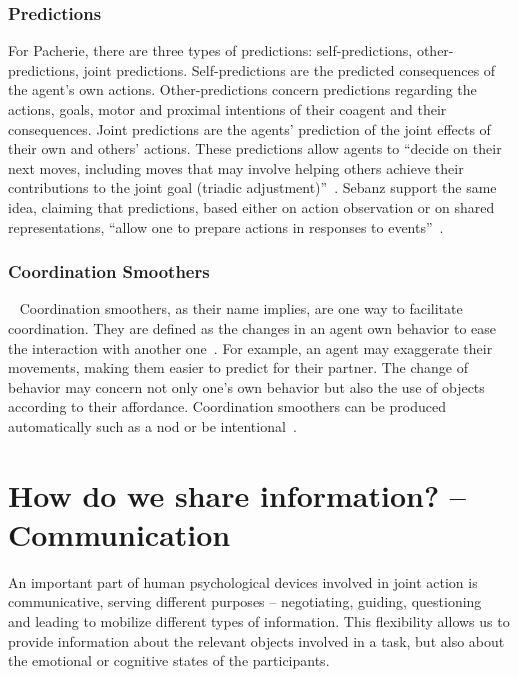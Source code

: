 \documentclass[a4paper,11pt,twoside]{StyleThese}
\begin{document}
\subsubsection{Predictions}\label{chap1:subsubsec:pred}
For Pacherie, there are three types of predictions: self-predictions, other-predictions, joint predictions. Self-predictions are the predicted consequences of the agent's own actions. Other-predictions concern predictions regarding the actions, goals, motor and proximal intentions of their coagent and their consequences. Joint predictions are the agents' prediction of the joint effects of their own and others' actions. These predictions allow agents to ``decide on their next moves, including moves that may involve helping others achieve their contributions to the joint goal (triadic adjustment)''~\cite[pp.~354-355]{pacherie_2012_agency}. Sebanz \etal{} support the same idea, claiming that predictions, based either on action observation or on shared representations, ``allow one to prepare actions in responses to events''~\cite[p.~73]{sebanz_2006_joint}.

\subsubsection{Coordination Smoothers}~\label{chap1:subsubsec:coord_smooth}
Coordination smoothers, as their name implies, are one way to facilitate coordination. They are defined as the changes in an agent own behavior to ease the interaction with another one~\cite{vesper_2010_minimal}. For example, an agent may exaggerate their movements, making them easier to predict for their partner. The change of behavior may concern not only one's own behavior but also the use of objects according to their affordance. Coordination smoothers can be produced automatically such as a nod or be intentional~\cite{michael_2015_commitments}.

\section{How do we share information? -- Communication}\label{chap1:subsec:comm}
An important part of human psychological devices involved in joint action is communicative, serving different purposes – \eg negotiating, guiding, questioning~\cite{austin_1962_how, clark_1992_arenas, sperber_1995_relevance} and leading to mobilize different types of information. This flexibility allows us to provide information about the relevant objects involved in a task, but also about the emotional or cognitive states of the participants. 
\end{document}
